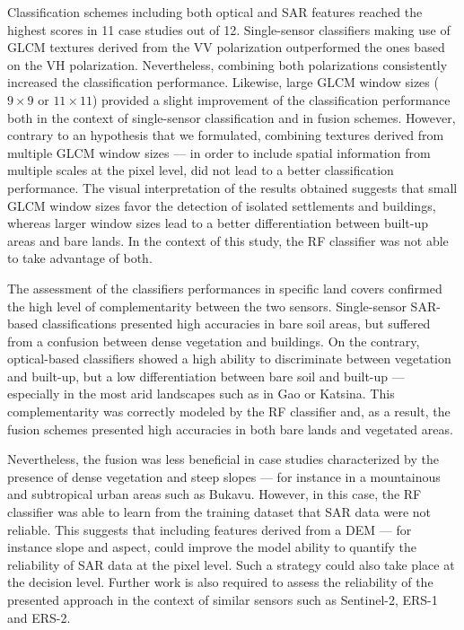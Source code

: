 \documentclass[remotesensing,article,submit,moreauthors,pdftex,10pt,a4paper]{Definitions/mdpi}
\begin{document}
Classification schemes including both optical and SAR features reached the
highest scores in 11 case studies out of 12. Single-sensor classifiers making
use of GLCM textures derived from the VV polarization outperformed the ones
based on the VH polarization. Nevertheless, combining both polarizations
consistently increased the classification performance. Likewise, large GLCM
window sizes (\(9 \times 9\) or \(11 \times 11\)) provided a slight improvement
of the classification performance both in the context of single-sensor
classification and in fusion schemes. However, contrary to an hypothesis that we
formulated, combining textures derived from multiple GLCM window sizes --- in
order to include spatial information from multiple scales at the pixel level,
did not lead to a better classification performance. The visual interpretation
of the results obtained suggests that small GLCM window sizes favor the
detection of isolated settlements and buildings, whereas larger window sizes
lead to a better differentiation between built-up areas and bare lands. In the
context of this study, the RF classifier was not able to take advantage of both.

The assessment of the classifiers performances in specific land covers confirmed
the high level of complementarity between the two sensors. Single-sensor
SAR-based classifications presented high accuracies in bare soil areas, but
suffered from a confusion between dense vegetation and buildings. On the
contrary, optical-based classifiers showed a high ability to discriminate
between vegetation and built-up, but a low differentiation between bare soil and
built-up --- especially in the most arid landscapes such as in Gao or Katsina.
This complementarity was correctly modeled by the RF classifier and, as a
result, the fusion schemes presented high accuracies in both bare lands and
vegetated areas.

Nevertheless, the fusion was less beneficial in case studies characterized by
the presence of dense vegetation and steep slopes --- for instance in a
mountainous and subtropical urban areas such as Bukavu. However, in this case,
the RF classifier was able to learn from the training dataset that SAR data were
not reliable. This suggests that including features derived from a DEM --- for
instance slope and aspect, could improve the model ability to quantify the
reliability of SAR data at the pixel level. Such a strategy could also take
place at the decision level. Further work is also required to assess the
reliability of the presented approach in the context of similar sensors such as
Sentinel-2, ERS-1 and ERS-2.

\authorcontributions{}




\end{document}
